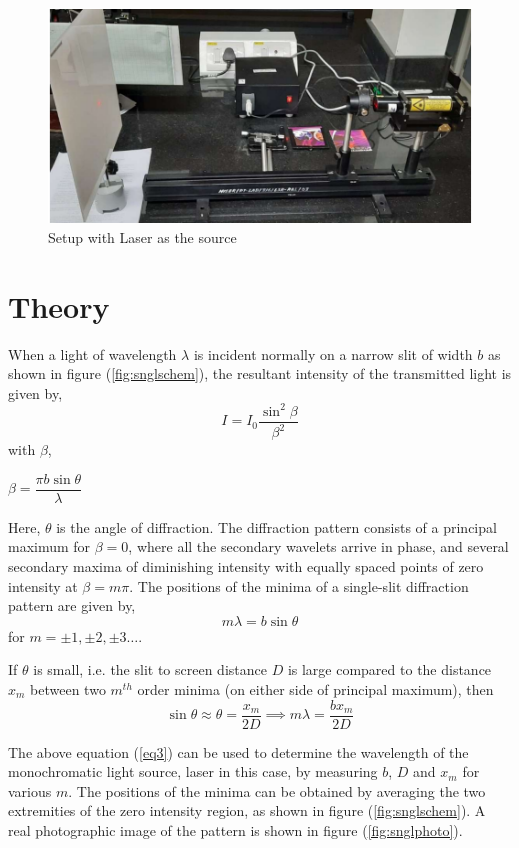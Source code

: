 \documentclass{article}
\begin{document}
\begin{figure}[h!]
    \centering
    \includegraphics[scale = 0.95]{Figures/setup.png}
    \captionsetup{justification=centering}
    \caption{Setup with Laser as the source}
    \label{fig:setup}
\end{figure}


\section{Theory}
\noindent When a light of wavelength $\lambda$ is incident normally on a narrow slit of width $b$ as shown in figure (\ref{fig:snglschem}), the resultant intensity of the transmitted light is given by,
\begin{equation}
\label{eq1}
    I = I_0 \dfrac{\sin^2 \beta}{\beta^2}
\end{equation}
with $\beta$,
\begin{center}
    $\beta = \dfrac{\pi b \sin \theta}{\lambda}$
\end{center}
\noindent
Here, $\theta$ is the angle of diffraction. The diffraction pattern consists of a principal maximum 
for $\beta = 0$, where all the secondary wavelets arrive in phase, and several secondary maxima of 
diminishing intensity with equally spaced points of zero intensity at $\beta = m \pi$. The positions of 
the minima of a single-slit diffraction pattern are given by,
\begin{equation}
    m \lambda = b \sin \theta
\end{equation}
for $m = \pm 1, \pm 2, \pm 3 \ldots$.
\par
\noindent
If $\theta$ is small, i.e. the slit to screen distance $D$ is large compared to the distance $x_m$ between two $m^{th}$ order minima (on either side of principal maximum), then
\begin{equation}
\label{eq3}
    \sin \theta \approx \theta = \dfrac{x_m}{2 D} \implies m \lambda = \dfrac{b x_m}{2D}
\end{equation}
\par
\noindent The above equation (\ref{eq3}) can be used to determine the wavelength of the monochromatic light source, laser in this case, by measuring $b$, $D$ and $x_m$ for various $m$. The positions of the 
minima can be obtained by averaging the two extremities of the zero intensity region, as shown 
in figure (\ref{fig:snglschem}). A real photographic image of the pattern is shown in figure (\ref{fig:snglphoto}).
\end{document}
